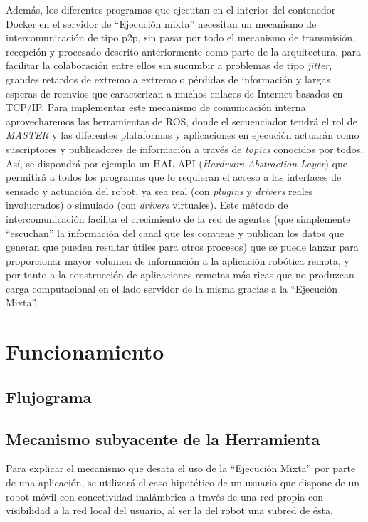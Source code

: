 Además, los diferentes programas que ejecutan en el interior del contenedor Docker en el servidor de ``Ejecución mixta'' necesitan un mecanismo de intercomunicación de tipo p2p, sin pasar por todo el mecanismo de transmisión, recepción y procesado descrito anteriormente como parte de la arquitectura, para facilitar la colaboración entre ellos sin sucumbir a problemas de tipo \textit{jitter}, grandes retardos de extremo a extremo o pérdidas de información y largas esperas de reenvios que caracterizan a muchos enlaces de Internet basados en TCP/IP. Para implementar este mecanismo de comunicación interna aprovecharemos las herramientas de ROS, donde el secuenciador tendrá el rol de \textit{MASTER} y las diferentes plataformas y aplicaciones en ejecución actuarán como suscriptores y publicadores de información a través de \textit{topics} conocidos por todos. Así, se dispondrá por ejemplo un HAL API (\textit{Hardware Abstraction Layer}) que permitirá a todos los programas que lo requieran el acceso a las interfaces de sensado y actuación del robot, ya sea real (con \textit{plugins} y \textit{drivers} reales involucrados) o simulado (con \textit{drivers} virtuales). Este método de intercomunicación facilita el crecimiento de la red de agentes (que simplemente ``escuchan'' la información del canal que les conviene y publican los datos que generan que pueden resultar útiles para otros procesos) que se puede lanzar para proporcionar mayor volumen de información a la aplicación robótica remota, y por tanto a la construcción de aplicaciones remotas más ricas que no produzcan carga computacional en el lado servidor de la misma gracias a la ``Ejecución Mixta''.

\section{Funcionamiento}
\subsection{Flujograma}



\subsection{Mecanismo subyacente de la Herramienta}

Para explicar el mecanismo que desata el uso de la ``Ejecución Mixta'' por parte de una aplicación, se utilizará el caso hipotético de un usuario que dispone de un robot móvil con conectividad inalámbrica a través de una red propia con visibilidad a la red local del usuario, al ser la del robot una subred de ésta.

